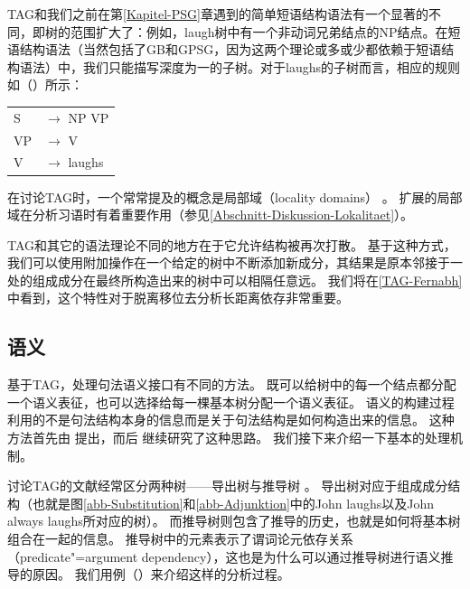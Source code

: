 TAG和我们之前在第\ref{Kapitel-PSG}章遇到的简单短语结构语法有一个显著的不同，即树的范围扩大了：例如，laugh树中有一个非动词兄弟结点的NP结点。在短语结构语法（当然包括了GB\indexgbc 和GPSG\indexgpsgc，因为这两个理论或多或少都依赖于短语结构语法）中，我们只能描写深度为一的子树。对于laughs的子树而言，相应的规则如（）所示：
\ea
\begin{tabular}[t]{@{}l@{ }l}
S  & $\to$ NP VP\\
VP & $\to$ V\\
V  & $\to$ laughs\\
\end{tabular}
\z
在讨论TAG时，一个常常提及的概念是局部域（{locality domains}）
。
扩展的局部域在分析习语时有着重要作用（参见\ref{Abschnitt-Diskussion-Lokalitaet}）。

TAG和其它的语法理论不同的地方在于它允许结构被再次打散。
基于这种方式，我们可以使用附加操作在一个给定的树中不断添加新成分，其结果是原本邻接于一处的组成成分在最终所构造出来的树中可以相隔任意远。
我们将在\ref{TAG-Fernabh}中看到，这个特性对于脱离移位去分析长距离依存非常重要。

\subsection{语义}

基于TAG，处理句法语义接口有不同的方法。
既可以给树中的每一个结点都分配一个语义表征，也可以选择给每一棵基本树分配一个语义表征。
语义的构建过程利用的不是句法结构本身的信息而是关于句法结构是如何构造出来的信息。
这种方法首先由 \citet{CK98a}提出，而后 \citet{KJ2003a}继续研究了这种思路。
我们接下来介绍一下基本的处理机制。

讨论TAG的文献经常区分两种树——导出树与推导树
。
导出树对应于组成成分结构（也就是图\ref{abb-Substitution}和\ref{abb-Adjunktion}中的John laughs以及John always laughs所对应的树）。
而推导树则包含了推导的历史，也就是如何将基本树组合在一起的信息。
推导树中的元素表示了谓词论元依存关系（predicate"=argument dependency），这也是为什么可以通过推导树进行语义推导的原因。
我们用例（）来介绍这样的分析过程。

